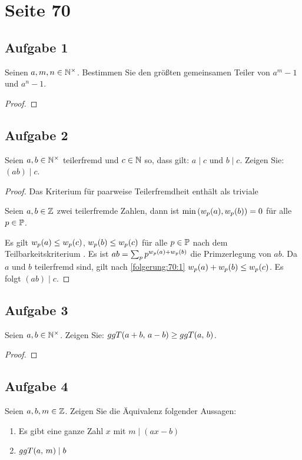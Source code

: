 \section{Seite 70}

\subsection{Aufgabe 1}
Seinen $a,m,n \in \mathbb{N}^\times{}$. Bestimmen Sie den größten gemeinsamen Teiler
von $a^m - 1$ und $a^n - 1$.
\begin{proof}
\end{proof}

\subsection{Aufgabe 2}
Seien $a,b \in \mathbb{N}^\times{}$ teilerfremd und $c \in \mathbb{N}{}$ so,
dass gilt: $a \mid c$ und $b \mid c$. Zeigen Sie: $(ab) \mid c$.
\begin{proof}
  Das Kriterium für paarweise Teilerfremdheit \parencite[50]{book:zahlentheorie}
  enthält als triviale
  \begin{folgerung}
    \label{folgerung:70:1}
    Seien $a,b \in \mathbb{Z}{}$ zwei teilerfremde Zahlen, dann ist
    $\min{(w_p(a), w_p(b))} = 0$
    für alle $p \in \mathbb{P}{}$.
  \end{folgerung}
  \noindent
  Es gilt $w_p(a) \leq w_p(c)$,
  $w_p(b) \leq w_p(c)$ für alle $p \in \mathbb{P}{}$
  nach dem Teilbarkeitskriterium \parencite[50]{book:zahlentheorie}.
  Es ist $ab = \sum_{p} p^{w_p(a) + w_p(b)}$
  die Primzerlegung von $ab$. Da $a$ und $b$ teilerfremd sind, gilt nach
  \autoref{folgerung:70:1} $w_p(a) + w_p(b)
    \leq w_p(c)$. Es folgt $(ab) \mid c$.
\end{proof}

\subsection{Aufgabe 3}
Seien $a,b \in \mathbb{N}^\times{}$. Zeigen Sie: $ggT(a + b,\,a - b) \geq ggT(a,\,b)$.
\begin{proof}
\end{proof}

\subsection{Aufgabe 4}
\label{70:4}
Seien $a,b,m \in \mathbb{Z}{}$. Zeigen Sie die Äquivalenz folgender Aussagen:
\begin{enumerate}[label=\roman*)]
  \item Es gibt eine ganze Zahl $x$ mit $m \mid (ax -b)$
  \item $ggT(a,\,m) \mid b$
\end{enumerate}

